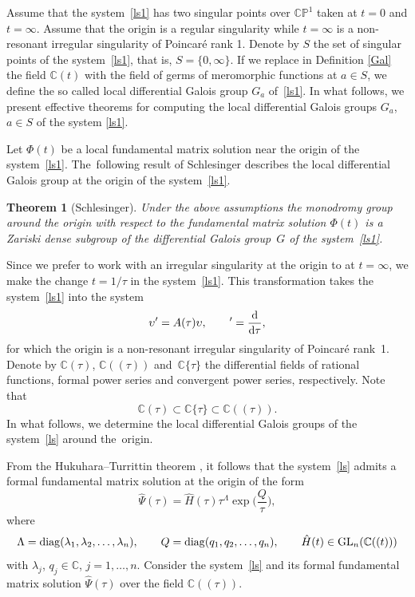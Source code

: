 \documentclass[pdftex]{sigma}
\numberwithin{equation}{section}
\newtheorem{Theorem}{Theorem}[section]
\begin{document}
 Assume that the system~\eqref{ls1} has two singular points over $\mathbb{C}\mathbb{P}^1$ taken at $t=0$ and $t=\infty$. Assume that
 the origin is a regular singularity while $t=\infty$ is a
 non-resonant irregular singularity of
 Poincar\'{e} rank 1. Denote by $S$ the set of singular points of the system~\eqref{ls1}, that is, $S=\{0, \infty\}$.
 If we replace in Definition \ref{Gal} the field $\mathbb{C}(t)$ with the field of germs of meromorphic functions at $a\in S$, we define the so called local differential Galois
 group $G_a$ of~\eqref{ls1}. In what follows, we present effective theorems for computing the local differential Galois groups $G_a$, $a\in S$ of the system
 \eqref{ls1}.

 Let $\Phi(t)$ be a local fundamental matrix solution near the origin of the system~\eqref{ls1}.
 The~following result of Schlesinger \cite{Sch} describes the local differential Galois group at the origin of the system~\eqref{ls1}.

 \begin{Theorem}[Schlesinger]\label{reg}
 Under the above assumptions the monodromy group around the origin with respect to the fundamental matrix solution
 $\Phi(t)$ is a Zariski dense subgroup of the differential Galois group~$G$ of the
 system~\eqref{ls1}.
 \end{Theorem}

Since we prefer to work with an irregular singularity at the origin to at $t=\infty$, we make the change $t=1/\tau$ in the
 system~\eqref{ls1}.
 This transformation takes the system~\eqref{ls1} into the system
 \begin{equation}
 \upsilon'=A(\tau) \upsilon,\qquad '=\frac{{\rm d}}{{\rm d} \tau} ,\label{ls}
 \end{equation}
 for which the origin is a non-resonant irregular singularity of Poincar\'{e} rank~1.
 Denote by $\mathbb{C}(\tau)$, $\mathbb{C}((\tau))$ and~$\mathbb{C}\{\tau\}$ the differential fields of rational functions, formal power series and convergent
 power series, respectively. Note that
 \[
 \mathbb{C}(\tau) \subset \mathbb{C}\{\tau\} \subset \mathbb{C}((\tau)) .
 \]
 In what follows, we determine the local differential Galois groups of the system~\eqref{ls} around the~origin.



 From the Hukuhara--Turrittin theorem \cite{W}, it follows that the
 system~\eqref{ls} admits a formal fundamental matrix solution at the origin of the form
 \begin{equation}
 \hat{\Psi}(\tau)=\hat{H}(\tau) \tau^{\Lambda} \exp\biggl(\frac{Q}{\tau}\biggr) ,\label{fls}
 \end{equation}
 where
 \[
 \Lambda={\rm diag} (\lambda_1, \lambda_2, \dots, \lambda_n),\qquad
 Q={\rm diag} (q_1, q_2, \dots, q_n),\qquad \hat{H}(t)\in{\rm GL}_n(\mathbb{C}((t)))
 \]
 with $\lambda_j$, $q_j \in\mathbb{C}$, $j=1, \dots, n$. Consider the system~\eqref{ls} and its formal fundamental matrix solution
 $\hat{\Psi}(\tau)$ over the field $\mathbb{C}((\tau))$.
\end{document}
